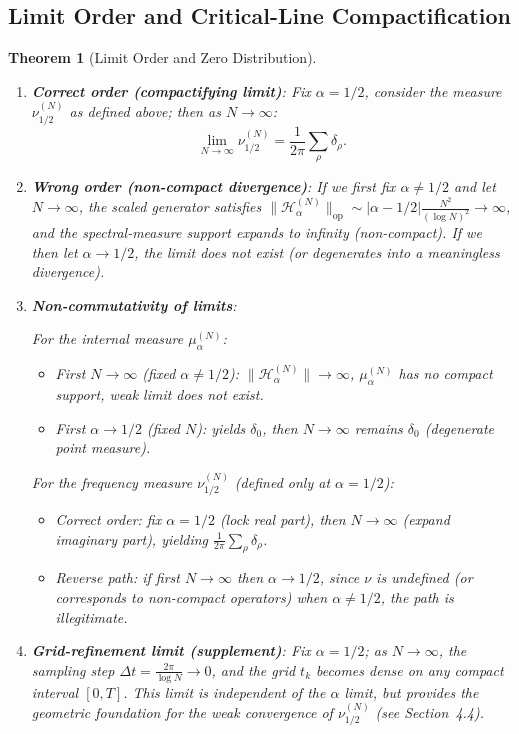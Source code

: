 \documentclass[12pt,a4paper]{amsart}
\theoremstyle{plain}
\newtheorem{theorem}{Theorem}[section]
\theoremstyle{definition}
\theoremstyle{remark}
\begin{document}
\subsection{Limit Order and Critical-Line Compactification}

\begin{theorem}[Limit Order and Zero Distribution]\label{thm:limitorder}\ 

\begin{enumerate}
\item[(A)] \textbf{Correct order (compactifying limit)}:
Fix $\alpha=1/2$, consider the measure $\nu_{1/2}^{(N)}$ as defined above; then as $N\to\infty$:
\[
\lim_{N\to\infty} \nu_{1/2}^{(N)} = \frac{1}{2\pi}\sum_{\rho} \delta_{\rho}.
\]

\item[(B)] \textbf{Wrong order (non-compact divergence)}:
If we first fix $\alpha \neq 1/2$ and let $N\to\infty$, the scaled generator satisfies $\|\mathcal{H}_{\alpha}^{(N)}\|_{\mathrm{op}} \sim |\alpha-1/2|\frac{N^2}{(\log N)^2} \to \infty$, and the spectral-measure support expands to infinity (non-compact). If we then let $\alpha\to 1/2$, the limit does not exist (or degenerates into a meaningless divergence).

\item[(C)] \textbf{Non-commutativity of limits}:

For the internal measure $\mu_\alpha^{(N)}$:
\begin{itemize}
\item First $N\to\infty$ (fixed $\alpha\neq 1/2$): $\|\mathcal{H}_\alpha^{(N)}\|\to\infty$, $\mu_\alpha^{(N)}$ has no compact support, weak limit does not exist.
\item First $\alpha\to 1/2$ (fixed $N$): yields $\delta_0$, then $N\to\infty$ remains $\delta_0$ (degenerate point measure).
\end{itemize}

For the frequency measure $\nu_{1/2}^{(N)}$ (defined only at $\alpha=1/2$):
\begin{itemize}
\item Correct order: fix $\alpha=1/2$ (lock real part), then $N\to\infty$ (expand imaginary part), yielding $\frac{1}{2\pi}\sum_\rho \delta_\rho$.
\item Reverse path: if first $N\to\infty$ then $\alpha\to 1/2$, since $\nu$ is undefined (or corresponds to non-compact operators) when $\alpha\neq 1/2$, the path is illegitimate.
\end{itemize}

\item[(D)] \textbf{Grid-refinement limit (supplement)}:
Fix $\alpha=1/2$; as $N\to\infty$, the sampling step $\Delta t = \frac{2\pi}{\log N} \to 0$, and the grid $t_k$ becomes dense on any compact interval $[0,T]$. This limit is independent of the $\alpha$ limit, but provides the geometric foundation for the weak convergence of $\nu_{1/2}^{(N)}$ (see Section~4.4).
\end{enumerate}
\end{theorem}
\end{document}
